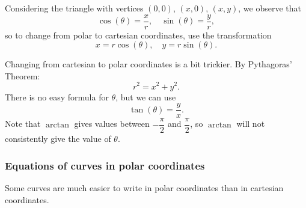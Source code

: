   Considering the triangle with vertices $(0, 0)$, $(x, 0)$, $(x, y)$, we observe that
    \[
      \cos(\theta) = \frac{x}{r}, \quad \sin(\theta) = \frac{y}{r},
    \]
  so to change from polar to cartesian coordinates, use the transformation
    \[
      x = r\cos(\theta), \quad y = r\sin(\theta).
    \]

  Changing from cartesian to polar coordinates is a bit trickier.  By Pythagoras' Theorem:
    \[
      r^2 = x^2 + y^2.
    \]
  There is no easy formula for $\theta$, but we can use
    \[
      \tan(\theta) = \frac{y}{x}.
    \]
  Note that $\arctan$ gives values between $-\dfrac{\pi}{2}$ and $\dfrac{\pi}{2}$, so $\arctan$ will not consistently give the value of $\theta$.

  \subsubsection*{Equations of curves in polar coordinates}

  Some curves are much easier to write in polar coordinates than in cartesian coordinates.

